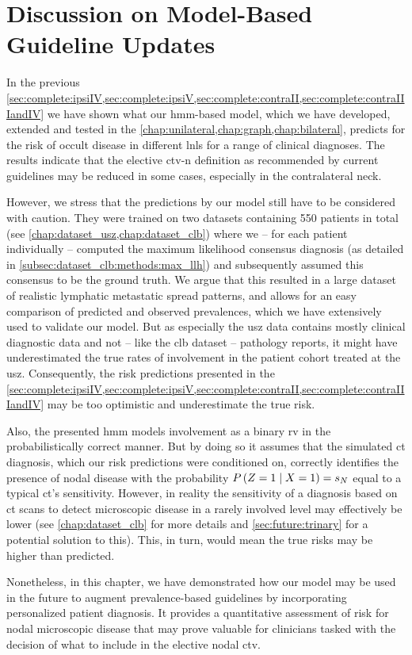 \documentclass[\relativeRoot/main.tex]{subfiles}
\begin{document}
\section[Discussion on Model-Based Guideline Updates]{Discussion on Model-Based\\Guideline Updates}
\label{sec:complete:dicussion}

In the previous \cref{sec:complete:ipsiIV,sec:complete:ipsiV,sec:complete:contraII,sec:complete:contraIIIandIV} we have shown what our \gls{hmm}-based model, which we have developed, extended and tested in the \cref{chap:unilateral,chap:graph,chap:bilateral}, predicts for the risk of occult disease in different \glspl{lnl} for a range of clinical diagnoses. The results indicate that the elective \gls{ctv-n} definition as recommended by current guidelines \cite{gregoire_delineation_2014,biau_selection_2019} may be reduced in some cases, especially in the contralateral neck.

However, we stress that the predictions by our model still have to be considered with caution. They were trained on two datasets containing 550 patients in total (see \cref{chap:dataset_usz,chap:dataset_clb}) where we -- for each patient individually -- computed the maximum likelihood consensus diagnosis (as detailed in \cref{subsec:dataset_clb:methods:max_llh}) and subsequently assumed this consensus to be the ground truth. We argue that this resulted in a large dataset of realistic lymphatic metastatic spread patterns, and allows for an easy comparison of predicted and observed prevalences, which we have extensively used to validate our model. But as especially the \gls{usz} data \cite{ludwig_detailed_2022} contains mostly clinical diagnostic data and not -- like the \gls{clb} dataset \cite{bauwens_prevalence_2021} -- pathology reports, it might have underestimated the true rates of involvement in the patient cohort treated at the \gls{usz}. Consequently, the risk predictions presented in the \cref{sec:complete:ipsiIV,sec:complete:ipsiV,sec:complete:contraII,sec:complete:contraIIIandIV} may be too optimistic and underestimate the true risk.

Also, the presented \gls{hmm} models involvement as a binary \acrshort{rv} in the probabilistically correct manner. But by doing so it assumes that the simulated \gls{ct} diagnosis, which our risk predictions were conditioned on, correctly identifies the presence of nodal disease with the probability $P \left( Z=1 \mid X=1 \right) = s_N$ equal to a typical \gls{ct}'s sensitivity. However, in reality the sensitivity of a diagnosis based on \gls{ct} scans to detect microscopic disease in a rarely involved level may effectively be lower (see \cref{chap:dataset_clb} for more details and \cref{sec:future:trinary} for a potential solution to this). This, in turn, would mean the true risks may be higher than predicted.

Nonetheless, in this chapter, we have demonstrated how our model may be used in the future to augment prevalence-based guidelines by incorporating personalized patient diagnosis. It provides a quantitative assessment of risk for nodal microscopic disease that may prove valuable for clinicians tasked with the decision of what to include in the elective nodal \gls{ctv}.
\end{document}
